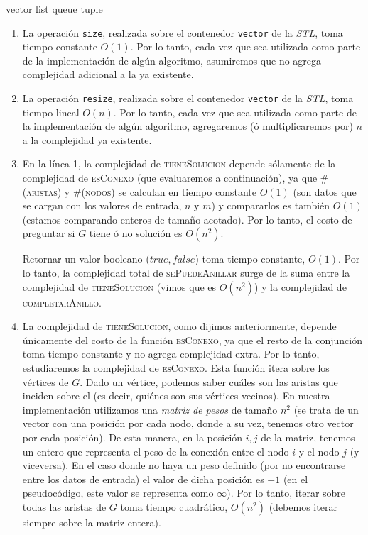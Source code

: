 vector
list
queue
tuple

\begin{enumerate}
  \item La operación \verb|size|, realizada sobre el contenedor \verb|vector| de la
  \textit{STL}, toma tiempo constante $O(1)$. Por lo tanto, cada vez que sea utilizada
  como parte de la implementación de algún algoritmo, asumiremos que no agrega complejidad
  adicional a la ya existente.

  \item La operación \verb|resize|, realizada sobre el contenedor \verb|vector| de la
  \textit{STL}, toma tiempo lineal $O(n)$. Por lo tanto, cada vez que sea utilizada
  como parte de la implementación de algún algoritmo, agregaremos (ó multiplicaremos por)
  $n$ a la complejidad ya existente.

  \item En la línea 1, la complejidad de \textsc{tieneSolucion} depende sólamente de
  la complejidad de \textsc{esConexo} (que evaluaremos a continuación), ya que
  \textsc{\#(aristas)} y \textsc{\#(nodos)} se calculan en tiempo constante $O(1)$
  (son datos que se cargan con los valores de entrada, $n$ y $m$) y compararlos es
  también $O(1)$ (estamos comparando enteros de tamaño acotado).
  Por lo tanto, el costo de preguntar si $G$ tiene ó no solución es $O(n^2)$.

  Retornar un valor booleano ($true, false$) toma tiempo constante, $O(1)$. Por lo tanto,
  la complejidad total de \textsc{sePuedeAnillar} surge de la suma entre la complejidad de
  \textsc{tieneSolucion} (vimos que es $O(n^2)$) y la complejidad de \textsc{completarAnillo}.

  \item La complejidad de \textsc{tieneSolucion}, como dijimos anteriormente, depende
  únicamente del costo de la función \textsc{esConexo}, ya que el resto de la conjunción
  toma tiempo constante y no agrega complejidad extra. Por lo tanto, estudiaremos la
  complejidad de \textsc{esConexo}. Esta función itera sobre los vértices de $G$.
  Dado un vértice, podemos saber cuáles son las aristas que inciden sobre el (es decir,
  quiénes son sus vértices vecinos). En nuestra implementación utilizamos una \textit{matriz de
  pesos} de tamaño $n^2$ (se trata de un vector con una posición por cada nodo, donde a su vez,
  tenemos otro vector por cada posición). De esta manera, en la posición $i,j$ de la matriz,
  tenemos un entero que representa el peso de la conexión entre el nodo $i$ y el nodo $j$ (y viceversa).
  En el caso donde no haya un peso definido (por no encontrarse entre los datos de entrada) el valor
 de dicha posición es $-1$ (en el pseudocódigo, este valor se representa como $\infty$).
  Por lo tanto, iterar sobre todas las aristas de $G$ toma tiempo
  cuadrático, $O(n^2)$ (debemos iterar siempre sobre la matriz entera).
\end{enumerate}

